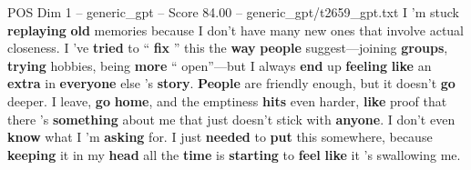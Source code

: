 \begin{textsample}{POS Dim 1 – generic\_gpt – Score 84.00 – generic\_gpt/t2659\_gpt.txt}
I ’m stuck \textbf{replaying} \textbf{old} memories because I don't have many new ones that involve actual closeness.
I ’ve \textbf{tried} to “ \textbf{fix} ” this the \textbf{way} \textbf{people} suggest—joining \textbf{groups}, \textbf{trying} hobbies, being \textbf{more} “ open”—but I always \textbf{end} up \textbf{feeling} \textbf{like} an \textbf{extra} in \textbf{everyone} else ’s \textbf{story}. \textbf{People} are friendly enough, but it doesn't \textbf{go} deeper.
I leave, \textbf{go} \textbf{home}, and the emptiness \textbf{hits} even harder, \textbf{like} proof that there ’s \textbf{something} about me that just doesn't stick with \textbf{anyone}.
I don't even \textbf{know} what I ’m \textbf{asking} for.
I just \textbf{needed} to \textbf{put} this somewhere, because \textbf{keeping} it in my \textbf{head} all the \textbf{time} is \textbf{starting} to \textbf{feel} \textbf{like} it ’s swallowing me.

\end{textsample}
